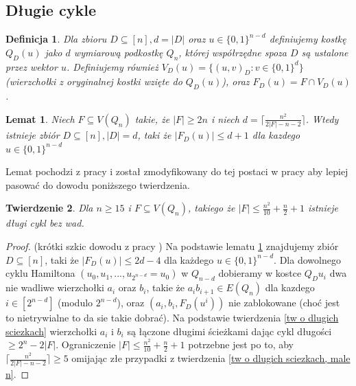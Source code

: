 \documentclass{pracamgr}
\newtheorem{defi}{Definicja}[section] %
\newtheorem{theorem}{Twierdzenie}
\newtheorem{lemma}[theorem]{Lemat}
\begin{document}
   \subsection{Długie cykle}
    \begin{defi}\label{przekrój kostki}
     Dla zbioru $D\subseteq[n], d=|D|$ oraz $u\in\{0,1\}^{n-d}$ definiujemy kostkę $Q_D(u)$ jako $d$ wymiarową podkostkę $Q_n$, której współrzędne spoza $D$
     są ustalone przez wektor $u$. Definiujemy również $V_D(u)=\{(u,v)_D:v\in\{0,1\}^d\}$ (wierzchołki z oryginalnej kostki wzięte do $Q_D(u)$), oraz
     $F_D(u)=F\cap V_D(u)$.
    \end{defi}
    \begin{lemma}\label{dlugi cykl - podzial kostki}
     Niech $F\subseteq V(Q_n)$ takie, że $|F|\ge 2n$ i niech $d=\lceil\frac{n^2}{2|F|-n-2}\rceil$.
     Wtedy istnieje zbiór $D\subseteq[n],|D|=d$, taki że $|F_D(u)|\le d+1$ dla kazdego $u\in\{0,1\}^{n-d}$
    \end{lemma}
    Lemat pochodzi z pracy \cite{Wie} i został zmodyfikowany do tej postaci w pracy \cite{FG} aby lepiej pasować do dowodu poniższego twierdzenia.
    \begin{theorem}\label{dlugi cykl - tw}
     Dla $n\ge15$ i $F\subseteq V(Q_n)$, takiego że $|F|\le\frac{n^2}{10}+\frac{n}{2}+1$ istnieje długi cykl bez wad.
    \end{theorem}
    \begin{proof}
     (krótki szkic dowodu z pracy \cite{FG})\newline
     Na podstawie lematu \ref{dlugi cykl - podzial kostki} znajdujemy zbiór $D\subseteq[n]$, taki że $|F_D(u)|\le 2d-4$ dla każdego $u\in\{0,1\}^{n-d}$.
     Dla dowolnego cyklu Hamiltona $(u_0,u_1,...,u_{2^{n-d}}=u_0)$ w $Q_{n-d}$ dobieramy w kostce $Q_D{u_i}$ dwa nie wadliwe
     wierzchołki $a_i$ oraz $b_i$, takie że $a_ib_{i+1}\in E(Q_n)$ dla kazdego $i\in[2^{n-d}]$ (modulo $2^{n-d}$),
     oraz $(a_i,b_i,F_D(u^i))$ nie zablokowane (choć jest to nietrywialne to da sie takie dobrać).
     Na podstawie twierdzenia \ref{tw o dlugich sciezkach} wierzchołki $a_i$ i $b_i$ są łączone długimi ścieżkami dając cykl długości $\ge 2^n-2|F|$.
     Ograniczenie $|F|\le\frac{n^2}{10}+\frac{n}{2}+1$ potrzebne jest po to, aby $\lceil\frac{n^2}{2|F|-n-2}\rceil\ge5$ omijając złe przypadki z twierdzenia
     \ref{tw o dlugich sciezkach, male n}.
    \end{proof}
\end{document}
